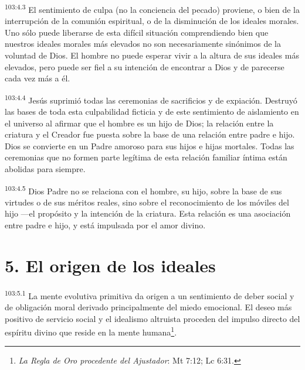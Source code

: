 \documentclass[twoside, 11pt]{book}
\begin{document}
\par
\textsuperscript{103:4.3} El sentimiento de culpa (no la conciencia del pecado) proviene, o bien de la interrupción de la comunión espiritual, o de la disminución de los ideales morales. Uno sólo puede liberarse de esta difícil situación comprendiendo bien que nuestros ideales morales más elevados no son necesariamente sinónimos de la voluntad de Dios. El hombre no puede esperar vivir a la altura de sus ideales más elevados, pero puede ser fiel a su intención de encontrar a Dios y de parecerse cada vez más a él.

\par
\textsuperscript{103:4.4} Jesús suprimió todas las ceremonias de sacrificios y de expiación. Destruyó las bases de toda esta culpabilidad ficticia y de este sentimiento de aislamiento en el universo al afirmar que el hombre es un hijo de Dios; la relación entre la criatura y el Creador fue puesta sobre la base de una relación entre padre e hijo. Dios se convierte en un Padre amoroso para sus hijos e hijas mortales. Todas las ceremonias que no formen parte legítima de esta relación familiar íntima están abolidas para siempre.

\par
\textsuperscript{103:4.5} Dios Padre no se relaciona con el hombre, su hijo, sobre la base de sus virtudes o de sus méritos reales, sino sobre el reconocimiento de los móviles del hijo ---el propósito y la intención de la criatura. Esta relación es una asociación entre padre e hijo, y está impulsada por el amor divino.

\section*{5. El origen de los ideales}
\par
\textsuperscript{103:5.1} La mente evolutiva primitiva da origen a un sentimiento de deber social y de obligación moral derivado principalmente del miedo emocional. El deseo más positivo de servicio social y el idealismo altruista proceden del impulso directo del espíritu divino que reside en la mente humana\footnote{\textit{La Regla de Oro procedente del Ajustador}: Mt 7:12; Lc 6:31.}.
\end{document}
